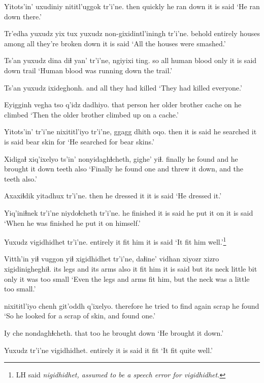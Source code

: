 \documentclass[12pt]{article}
\begin{document}
\gll Yitots'in' uxudiniy nititl'uggok tr'i'ne.
then  quickly {he ran down} {it is said} 
\glt `He ran down there.'
\glend

\gll Tr'edha yuxudz yix tux  yuxudz  non-gixidintl'iningh tr'i'ne.
behold  entirely houses among  all {they're broken down}  {it is said}
\glt `All the houses were smashed.'
\glend

\gll Ts'an yuxudz dina diɬ yan' tr'i'ne, ngiyixi ting.
so all  human blood only {it is said} down  trail
\glt `Human blood was running down the trail.'
\glend

\gll Ts'an yuxudz ixideghonh.
and all  {they had killed}
\glt `They had killed everyone.'
\glend

\gll Eyigginh vegha   tso q'idz dadhiyo.
{that person} {her older brother} cache on {he climbed}
\glt `Then the older brother climbed up on a cache.'
\glend

\gll Yitots'in' tr'i'ne nixititl'iyo tr'i'ne, ggagg dhith oqo.
then  {it is said} {he searched} {it is said} bear skin for
\glt `He searched for bear skins.'
\glend

\gll Xidigaɬ xiq'ixelyo ts'in' nonyidaghɬcheth, gighe'  yiɬ.
finally {he found} and {he brought it down} teeth  also
\glt `Finally he found one and threw it down, and the teeth also.'
\glend

\gll Axaxiɬdik yitadhux tr'i'ne.
then  {he dressed it} {it is said}
\glt `He dressed it.'
\glend

\gll Yiq'iniɬnek tr'i'ne niydoɬcheth tr'i'ne.
{he finished} {it is said} {he put it on} {it is said}
\glt `When he was finished he put it on himself.'
\glend

\gll Yuxudz vigidhidhet tr'i'ne.
entirely {it fit him} {it is said}
\glt `It fit him well.'\footnote{LH said \em nigidhidhet, \em assumed to be a speech error for \em vigidhidhet.}
\glend

\gll Vitth'in yiɬ vuggon yiɬ xigidhidhet tr'i'ne, daɬine' vidhan xiyozr xizro xigidinigheghiɬ.
{its legs} and {its arms} also {it fit him} {it is said} but  {its neck} {little bit} only {it was too small}
\glt `Even the legs and arms fit him, but the neck was a little too small.'
\glend

 nixititl'iyo  chenh  git'oddh q'ixelyo.
therefore {he tried to find}  again  scrap  {he found}
\glt `So he looked for a scrap of skin, and found one.'
\glend

\gll Iy che nondaghɬcheth.
that too {he brought down}
\glt `He brought it down.'
\glend

\gll Yuxudz tr'i'ne vigidhidhet.
entirely {it is said} {it fit}
\glt `It fit quite well.'
\glend
\end{document}
